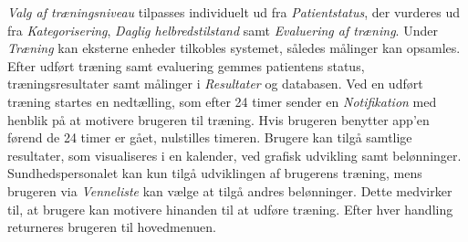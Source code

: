 \textit{Valg af træningsniveau} tilpasses individuelt ud fra \textit{Patientstatus}, der vurderes ud fra \textit{Kategorisering}, \textit{Daglig helbredstilstand} samt \textit{Evaluering af træning}.
Under \textit{Træning} kan eksterne enheder tilkobles systemet, således målinger kan opsamles. Efter udført træning samt evaluering gemmes patientens status, træningsresultater samt målinger i \textit{Resultater} og databasen. Ved en udført træning startes en nedtælling, som efter 24 timer sender en \textit{Notifikation} med henblik på at motivere brugeren til træning. Hvis brugeren benytter app'en førend de 24 timer er gået, nulstilles timeren.
Brugere kan tilgå samtlige resultater, som visualiseres i en kalender, ved grafisk udvikling samt belønninger. Sundhedspersonalet kan kun tilgå udviklingen af brugerens træning, mens brugeren via \textit{Venneliste} kan vælge at tilgå andres belønninger. Dette medvirker til, at brugere kan motivere hinanden til at udføre træning. Efter hver handling returneres brugeren til hovedmenuen.